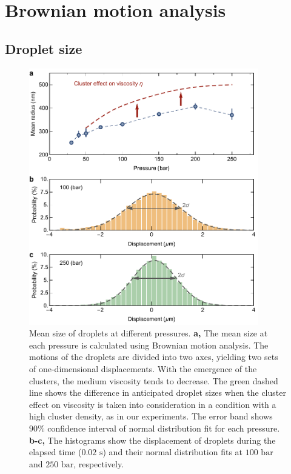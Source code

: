 \section{Brownian motion analysis}
\label{sec:ch2-4}

\subsection{Droplet size}
\label{sec:ch2-4-1}

\begin{figure}[ht!]
\centering
\includegraphics[width=100mm]{figures/ch2/Brownian/size.pdf}
\caption{Mean size of droplets at different pressures. \textbf{a,} The mean size at each pressure is calculated using Brownian motion analysis. The motions of the droplets are divided into two axes, yielding two sets of one-dimensional displacements. With the emergence of the clusters, the medium viscosity tends to decrease. The green dashed line shows the difference in anticipated droplet sizes when the cluster effect on viscosity is taken into consideration in a condition with a high cluster density, as in our experiments. The error band shows $90\%$ confidence interval of normal distribution fit for each pressure. \textbf{b-c,} The histograms show the displacement of droplets during the elapsed time ($0.02 \text{ s}$) and their normal distribution fits at $100 \text{ bar}$ and $250 \text{ bar}$, respectively.}
\label{fig:size}
\end{figure}

